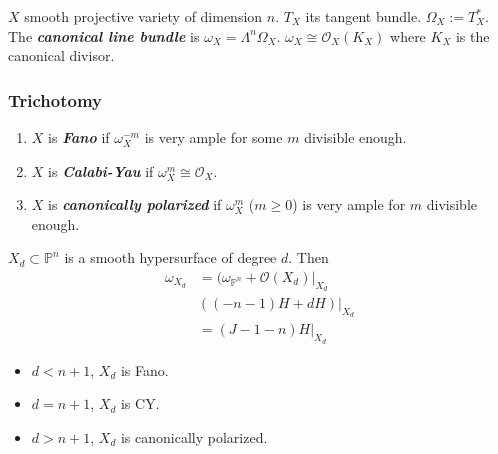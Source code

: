 $X$ smooth projective variety of dimension $n$. $T_{X}$ its tangent bundle. $\Omega_{X}:=T^{*}_{X}$. The \textit{\textbf{canonical line bundle}} is  $\omega_{X}=\Lambda^{n} \Omega_{X}$. $\omega_{X}\cong \mathcal{O}_{X}(K_{X})$ where $K_{X}$ is the canonical divisor.

\subsubsection{Trichotomy}
\begin{enumerate}
	\item $X$ is \textit{\textbf{Fano}} if $\omega_{X}^{-m}$ is very ample for some $m$ divisible enough.
	\item $X$ is \textit{\textbf{Calabi-Yau}} if $\omega_{X}^{m} \cong  \mathcal{O}_{X}$.
	\item $X$ is \textit{\textbf{canonically polarized}} if $\omega_{X}^{m}$ ($m\geq 0$) is very ample for $m$ divisible enough.
\end{enumerate}

\begin{example}
	$X_{d}\subset \mathbb{P}^{n}$ is a smooth hypersurface of degree $d$. Then 
	\begin{align*}
		\omega_{X_{d}}&=(\omega_{\mathbb{P}^{n}}+\mathcal{O}(X_{d})|_{X_{d}}\\
			      &((-n-1)H+dH)|_{X_{d}}\\
			      &=(J-1-n)H|_{X_{d}}
	\end{align*}
	\begin{itemize}
		\item $d<n+1$,  $X_{d}$ is Fano.
		\item $d=n+1$, $X_{d}$ is CY.
		\item $d>n+1$,  $X_{d}$ is canonically polarized.
	\end{itemize}
\end{example}

